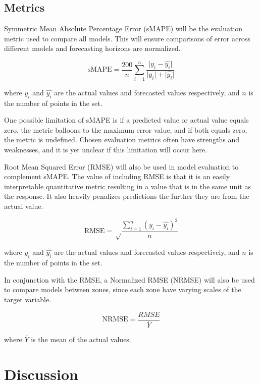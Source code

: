 \documentclass[sigconf]{acmart}
\begin{document}
\subsection{Metrics}
Symmetric Mean Absolute Percentage Error (sMAPE) will be the evaluation metric used to compare all models. This will ensure comparisons of error across different models and forecasting horizons are normalized. 

\begin{equation}
\text{sMAPE} =\frac{200}{n}\sum_{i=1}^{n}\frac{\lvert y_i - \hat{y_i} \rvert}{\lvert y_i \rvert + \lvert \hat{y_i} \rvert}
\end{equation}

where $y_i$ and $\hat{y_i}$ are the actual values and forecasted values respectively, and $n$ is the number of points in the set.

One possible limitation of sMAPE is if a predicted value or actual value equals zero, the metric balloons to the maximum error value, and if both equals zero, the metric is undefined. Chosen evaluation metrics often have strengths and weaknesses, and it is yet unclear if this limitation will occur here.

Root Mean Squared Error (RMSE) will also be used in model evaluation to complement sMAPE. The value of including RMSE is that it is an easily interpretable quantitative metric resulting in a value that is in the same unit as the response. It also heavily penalizes predictions the further they are from the actual value.

\begin{equation}
\text{RMSE} =\sqrt\frac{\sum_{i=1}^{n}(y_i - \hat{y_i})^2}{n}
\end{equation}

where $y_i$ and $\hat{y_i}$ are the actual values and forecasted values respectively, and $n$ is the number of points in the set.

In conjunction with the RMSE, a Normalized RMSE (NRMSE) will also be used to compare models between zones, since each zone have varying scales of the target variable.

\begin{equation}
\text{NRMSE} = \frac{RMSE}{\bar{Y}}
\end{equation}

where $\bar{Y}$ is the mean of the actual values.

\section{Discussion}
\end{document}
